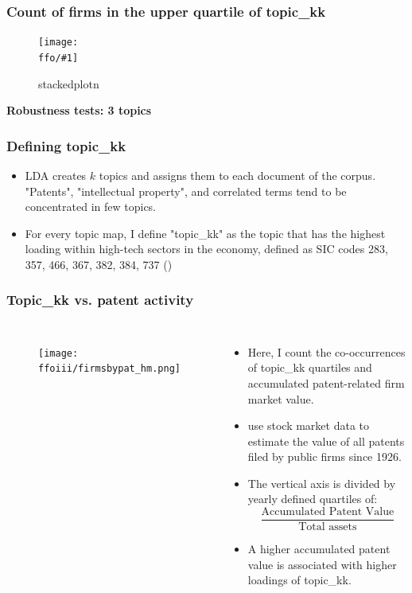 \documentclass{beamer}
\newcommand{\ffo}{dicfullmc10thr10defnob40noa0_8_4t}
\newcommand{\ffoiii}{dicfullmc10thr10defnob5noa0_8_3t}
\newcommand{\insertfigure}[2]{
\begin{figure}[h!]
  \centering
  \texttt{[image: \\ffo/\#1]}
  \centering
  \captionsetup{font=scriptsize}
  \caption{#2}
  \label{fig:#1}
\end{figure}
}
\begin{document}
\begin{frame}
\frametitle{Count of firms in the upper quartile of topic\_kk}
\insertfigure{stackedplot_n}{stackedplotn}
\end{frame}

\begin{frame}
\label{robthree}
\centering
\huge\bfseries Robustness tests: 3 topics
\hyperlink{results}{}
\end{frame}

\begin{frame}
  \frametitle{Defining topic\_kk}
  \begin{itemize}
  \item LDA creates $k$ topics and assigns them to each document of the corpus. "Patents", "intellectual property", and correlated terms tend to be concentrated in few topics.
  \item For every topic map, I define "topic\_kk" as the topic that has the highest loading within high-tech sectors in the economy, defined as SIC codes 283, 357, 466, 367, 382, 384, 737 (\cite{Brown2009-zp}) 
  
\end{itemize}

\end{frame}


\begin{frame}
\frametitle{Topic\_kk vs. patent activity}
       \begin{columns}
             \begin{figure}[h!]
		  \centering
		  \texttt{[image: \\ffoiii/firmsbypat\_hm.png]}
		  \captionsetup{font=scriptsize}
		  \label{fig:firmsbypathm}
			\end{figure}
          \scriptsize
              \begin{itemize}
              \item Here, I count the co-occurrences of topic\_kk quartiles and accumulated patent-related firm market value.
              \item \cite{Kogan2017-fx} use stock market data to estimate the value of all patents filed by public firms since 1926.
			  \item The vertical axis is divided by yearly defined quartiles of:
			  \begin{equation}
  				\frac{\text{Accumulated Patent Value}}{\text{Total assets}}
				\end{equation}
			  \item A higher accumulated patent value is associated with higher loadings of topic\_kk.
			\end{itemize}
	  \end{columns} 
\end{frame}
\end{document}
